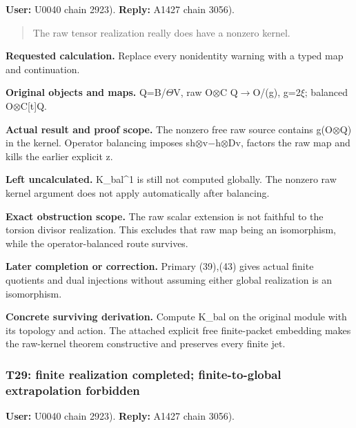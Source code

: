 \documentclass[10pt,a4paper,oneside]{report}
\begin{document}
\textbf{User:} U0040
\protect{} chain 2923).
\textbf{Reply:} A1427
\protect{} chain 3056).

\begin{quote}
The raw tensor realization really does have a nonzero kernel.
\end{quote}

\textbf{Requested calculation.} Replace every nonidentity warning with a
typed map and continuation.

\textbf{Original objects and maps.}
Q=B/\allowbreak{}\ensuremath{Θ}\allowbreak{}V, raw
O\allowbreak{}\ensuremath{⊗}\allowbreak{}C
Q\allowbreak{}\ensuremath{→}\allowbreak{}O/(g),
g=2\allowbreak{}\ensuremath{ξ}\allowbreak{}; balanced
O\allowbreak{}\ensuremath{⊗}\allowbreak{}C[t]Q.

\textbf{Actual result and proof scope.} The nonzero free raw source
contains g(O\allowbreak{}\ensuremath{⊗}\allowbreak{}Q) in the kernel.
Operator balancing imposes
sh\allowbreak{}\ensuremath{⊗}\allowbreak{}v\allowbreak{}\ensuremath{−}\allowbreak{}h\allowbreak{}\ensuremath{⊗}\allowbreak{}Dv,
factors the raw map and kills the earlier explicit z.

\textbf{Left uncalculated.} K\_bal\^{}1 is still not computed globally.
The nonzero raw kernel argument does not apply automatically after
balancing.

\textbf{Exact obstruction scope.} The raw scalar extension is not
faithful to the torsion divisor realization. This excludes that raw map
being an isomorphism, while the operator-balanced route survives.

\textbf{Later completion or correction.} Primary (39),(43) gives actual
finite quotients and dual injections without assuming either global
realization is an isomorphism.

\textbf{Concrete surviving derivation.} Compute K\_bal on the original
module with its topology and action. The attached explicit free
finite-packet embedding makes the raw-kernel theorem constructive and
preserves every finite jet.

\subsubsection{T29: finite realization completed; finite-to-global
extrapolation
forbidden}\label{t29-finite-realization-completed-finite-to-global-extrapolation-forbidden}

\textbf{User:} U0040
\protect{} chain 2923).
\textbf{Reply:} A1427
\protect{} chain 3056).
\end{document}
